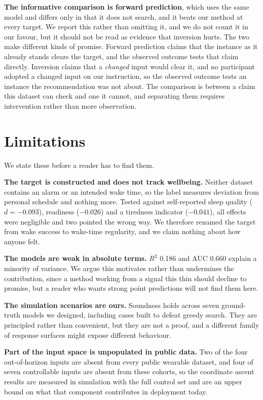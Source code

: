 \documentclass[conference]{IEEEtran}
\begin{document}
\textbf{The informative comparison is forward prediction}, which uses the same
model and differs only in that it does not search, and it beats our method at
every target. We report this rather than omitting it, and we do not count it in
our favour, but it should not be read as evidence that inversion hurts. The two
make different kinds of promise. Forward prediction claims that the instance as
it already stands clears the target, and the observed outcome tests that claim
directly. Inversion claims that a \emph{changed} input would clear it, and no
participant adopted a changed input on our instruction, so the observed outcome
tests an instance the recommendation was not about. The comparison is between a
claim this dataset can check and one it cannot, and separating them requires
intervention rather than more observation.

\section{Limitations}
\label{sec:limitations}

We state these before a reader has to find them.

\textbf{The target is constructed and does not track wellbeing.} Neither dataset
contains an alarm or an intended wake time, so the label measures deviation from
personal schedule and nothing more. Tested against self-reported sleep quality
($d = -0.093$), readiness ($-0.026$) and a tiredness indicator ($-0.041$), all
effects were negligible and two pointed the wrong way. We therefore renamed the
target from wake success to wake-time regularity, and we claim nothing about how
anyone felt.

\textbf{The models are weak in absolute terms.} $R^2$ 0.186 and AUC 0.660
explain a minority of variance. We argue this motivates rather than undermines
the contribution, since a method working from a signal this thin should decline
to promise, but a reader who wants strong point predictions will not find them
here.

\textbf{The simulation scenarios are ours.} Soundness holds across seven
ground-truth models we designed, including cases built to defeat greedy search.
They are principled rather than convenient, but they are not a proof, and a
different family of response surfaces might expose different behaviour.

\textbf{Part of the input space is unpopulated in public data.} Two of the four
out-of-horizon inputs are absent from every public wearable dataset, and four of
seven controllable inputs are absent from these cohorts, so the coordinate
ascent results are measured in simulation with the full control set and are an
upper bound on what that component contributes in deployment today.
\end{document}
